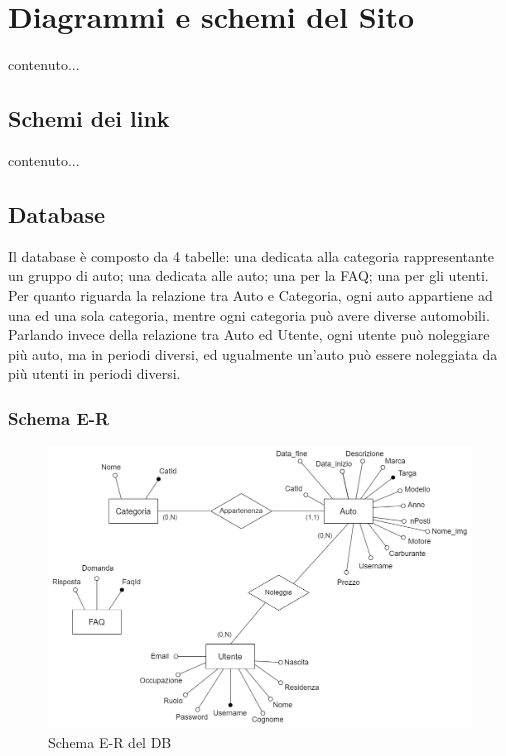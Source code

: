 \documentclass[12pt,a4paperS]{report}
\begin{document}
	\hypertarget{diagrammi}{\chapter{Diagrammi e schemi del Sito}}
	\label{diagrammi}
		\begin{normalsize}
			contenuto...
			\section{Schemi dei link}
				contenuto...
				
			\section{Database}
				Il database è composto da 4 tabelle: una dedicata alla categoria rappresentante un gruppo di auto; una dedicata alle auto; una per la FAQ; una per gli utenti.
				\newline
				Per quanto riguarda la relazione tra Auto e Categoria, ogni auto appartiene ad una ed una sola categoria, mentre ogni categoria può avere diverse automobili.
				\newline
				Parlando invece della relazione tra Auto ed Utente, ogni utente può noleggiare più auto, ma in periodi diversi, ed ugualmente un'auto può essere noleggiata da più utenti in periodi diversi.
				\subsection{Schema E-R}
					\begin{figure}[H]
						\centering
						\includegraphics[width=1.15\textwidth, height=1.15\textheight, trim=100 0 0 0,keepaspectratio]{Grafici/Database.png}
						\newline
						\caption{Schema E-R del DB}
					\end{figure}
		\end{normalsize}
		
\end{document}
